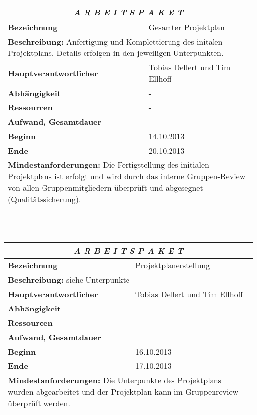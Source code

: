 \documentclass[fontsize=12pt,paper=a4,twoside]{scrartcl}
\begin{document}
\begin{tabular}{p{7.5cm}|p{7.5cm}}\toprule
\multicolumn{2}{c}{\textbf{\textit{A R B E I T S P A K E T \quad 1}}} \\ \toprule \hline
\textbf{Bezeichnung} & Gesamter Projektplan\\\hline
\multicolumn{2}{p{15cm}}{\textbf{Beschreibung:} \newline 
Anfertigung und Komplettierung des initalen Projektplans. Details erfolgen in den jeweiligen Unterpunkten.}  \\\hline
\textbf{Hauptverantwortlicher} & Tobias Dellert und Tim Ellhoff\\\hline
\textbf{Abhängigkeit} & -\\\hline
\textbf{Ressourcen} & -\\\hline
\textbf{Aufwand, Gesamtdauer} & \\\hline
\textbf{Beginn} & 14.10.2013 \\\hline
\textbf{Ende} & 20.10.2013\\\hline
\multicolumn{2}{p{15cm}}{\textbf{Mindestanforderungen: } \newline
Die Fertigstellung des initialen Projektplans ist erfolgt und wird durch das interne Gruppen-Review von allen Gruppenmitgliedern überprüft und abgesegnet (Qualitätssicherung).}  \\ \toprule
\end{tabular} \\\\

\begin{tabular}{p{7.5cm}|p{7.5cm}}\toprule
\multicolumn{2}{c}{\textbf{\textit{A R B E I T S P A K E T \quad 1.1}}} \\ \toprule \hline
\textbf{Bezeichnung} & Projektplanerstellung\\\hline
\multicolumn{2}{p{15cm}}{\textbf{Beschreibung:} \newline 
siehe Unterpunkte}  \\\hline
\textbf{Hauptverantwortlicher} & Tobias Dellert und Tim Ellhoff\\\hline
\textbf{Abhängigkeit} & -\\\hline
\textbf{Ressourcen} & -\\\hline
\textbf{Aufwand, Gesamtdauer} & \\\hline
\textbf{Beginn} & 16.10.2013 \\\hline
\textbf{Ende} & 17.10.2013\\\hline
\multicolumn{2}{p{15cm}}{\textbf{Mindestanforderungen: } \newline
Die Unterpunkte des Projektplans wurden abgearbeitet und der Projektplan kann im Gruppenreview überprüft werden.}  \\ \toprule
\end{tabular} \\\\
\end{document}
